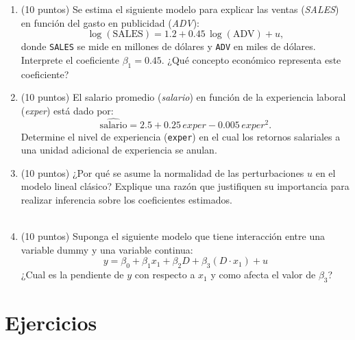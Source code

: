 \documentclass[10pt,a4paper]{article}
\begin{document}
\begin{enumerate}
    \item (10 puntos) Se estima el siguiente modelo para explicar las ventas (\emph{SALES})
        en función del gasto en publicidad (\emph{ADV}):
        \[
          \log(\text{SALES})
          = 1.2 + 0.45\,\log(\text{ADV}) + u ,
        \]
        donde \texttt{SALES} se mide en millones de dólares y \texttt{ADV}
        en miles de dólares. Interprete el coeficiente \(\beta_1 = 0.45\). ¿Qué concepto económico representa este coeficiente?\\

        
\item (10 puntos) El salario promedio (\emph{salario}) en función de la experiencia laboral
        (\emph{exper}) está dado por:
        \[
          \widehat{\text{salario}}
          = 2.5 + 0.25\,exper - 0.005\,exper^2 .
        \]
        Determine el nivel de experiencia (\texttt{exper}) en el cual los
                retornos salariales a una unidad adicional de experiencia
                se anulan.
 \\
 

\item (10 puntos) ¿Por qué se asume la normalidad de las perturbaciones \(u\)
        en el modelo lineal clásico? Explique una razón   que justifiquen su importancia para realizar inferencia
        sobre los coeficientes estimados.
        \\
\\


\item (10 puntos) Suponga el siguiente modelo que tiene interacción entre una variable dummy y una variable continua:
$$y = \beta_0 + \beta_1 x_1 + \beta_2D+\beta_3(D\cdot x_1)+u$$
¿Cual es la pendiente de $y$ con respecto a $x_1$ y como afecta el valor de $\beta_3$?
\\

\end{enumerate}

\section{Ejercicios}
\end{document}
